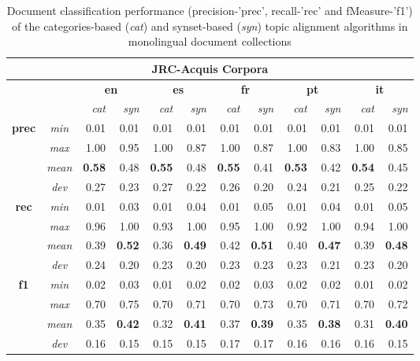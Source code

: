 \begin{table}[ht]\centering
\begin{center}
\small
\begin{tabular}{cc|rr||rr||rr||rr||rr}
    \hline
    \multicolumn{12}{c}{\textbf{JRC-Acquis Corpora}} \\
    \hline
    & & \multicolumn{2}{c}{\textbf{en}} &
      \multicolumn{2}{c}{\textbf{es}} &
      \multicolumn{2}{c}{\textbf{fr}} &
      \multicolumn{2}{c}{\textbf{pt}} &
      \multicolumn{2}{c}{\textbf{it}}\\
    & & {\textit{cat}} & {\textit{syn}} & {\textit{cat}} & {\textit{syn}} & {\textit{cat}} & {\textit{syn}} & {\textit{cat}} & {\textit{syn}} & {\textit{cat}} & {\textit{syn}} \\
    \hline
    \multirow{4}{*}{\textbf{prec}} 
    &{\textit{min}}     &0.01 &0.01 &0.01 &0.01 &0.01 &0.01 &0.01 &0.01 &0.01 &0.01 \\
    &{\textit{max}}     &1.00 &0.95 &1.00 &0.87 &1.00 &0.87 &1.00 &0.83 &1.00 &0.85\\
    &{\textit{mean}}    &\textbf{0.58} &0.48 &\textbf{0.55} &0.48 &\textbf{0.55} &0.41 &\textbf{0.53} &0.42 &\textbf{0.54} &0.45 \\
    &{\textit{dev}}     &0.27 &0.23 &0.27 &0.22 &0.26 &0.20 &0.24 &0.21 &0.25 &0.22 \\
    \hline
    \multirow{4}{*}{\textbf{rec}} 
    &{\textit{min}}     &0.01 &0.03 &0.01 &0.04 &0.01 &0.05 &0.01 &0.04 &0.01 &0.05\\
    &{\textit{max}}     &0.96 &1.00 &0.93 &1.00 &0.95 &1.00 &0.92 &1.00 &0.94 &1.00\\
    &{\textit{mean}}    &0.39 &\textbf{0.52} &0.36 &\textbf{0.49} &0.42 &\textbf{0.51} &0.40 &\textbf{0.47} &0.39 &\textbf{0.48} \\
    &{\textit{dev}}     &0.24 &0.20 &0.23 &0.20 &0.23 &0.23 &0.23 &0.21 &0.23 &0.20 \\
    \hline
    \multirow{4}{*}{\textbf{f1}} 
    &{\textit{min}}     &0.02 &0.03 &0.01 &0.02 &0.02 &0.03 &0.02 &0.02 &0.01 &0.02 \\
    &{\textit{max}}     &0.70 &0.75 &0.70 &0.71 &0.70 &0.73 &0.70 &0.71 &0.70 &0.72\\
    &{\textit{mean}}    &0.35 &\textbf{0.42} &0.32 &\textbf{0.41} &0.37 &\textbf{0.39} &0.35 &\textbf{0.38} &0.31 &\textbf{0.40} \\
    &{\textit{dev}}     &0.16 &0.15 &0.15 &0.15 &0.17 &0.17 &0.16 &0.16 &0.16 &0.15\\
\end{tabular}
\end{center}
\caption{Document classification performance (precision-'prec', recall-'rec' and fMeasure-'f1') of the categories-based (\textit{cat}) and synset-based (\textit{syn}) topic alignment algorithms in monolingual document collections}
\label{tb:mono-class}
\end{table}


